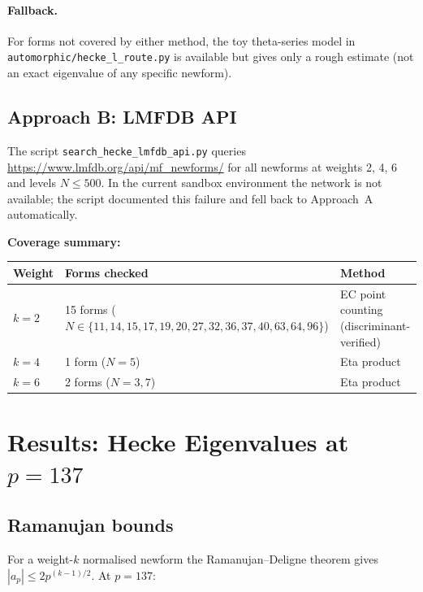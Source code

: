 \documentclass[12pt,a4paper]{article}
\begin{document}
\paragraph{Fallback.}
For forms not covered by either method, the toy theta-series model in
\texttt{automorphic/hecke\_l\_route.py} is available but gives only a rough
estimate (not an exact eigenvalue of any specific newform).

\subsection{Approach B: LMFDB API}

The script \texttt{search\_hecke\_lmfdb\_api.py} queries
\url{https://www.lmfdb.org/api/mf_newforms/}
for all newforms at weights 2, 4, 6 and levels $N \le 500$.
In the current sandbox environment the network is not available;
the script documented this failure and fell back to Approach~A automatically.

\bigskip
\noindent
\textbf{Coverage summary:}
\begin{center}
\begin{tabular}{lll}
\toprule
Weight & Forms checked & Method \\
\midrule
$k=2$ & 15 forms ($N \in \{11,14,15,17,19,20,27,32,36,37,40,63,64,96\}$) & EC point counting (discriminant-verified) \\
$k=4$ & 1 form ($N=5$) & Eta product \\
$k=6$ & 2 forms ($N=3, 7$) & Eta product \\
\bottomrule
\end{tabular}
\end{center}

\section{Results: Hecke Eigenvalues at \texorpdfstring{$p=137$}{p=137}}

\subsection{Ramanujan bounds}

For a weight-$k$ normalised newform the Ramanujan--Deligne theorem gives
$|a_p| \le 2p^{(k-1)/2}$.  At $p = 137$:
\end{document}
